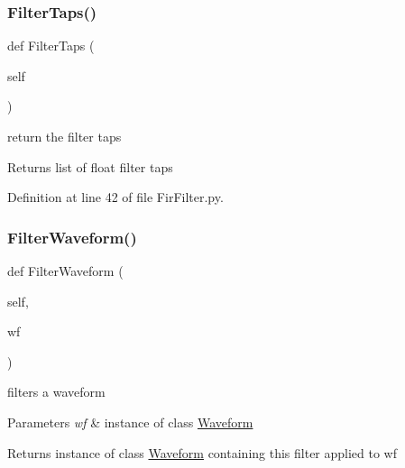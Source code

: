 \subsubsection{\texorpdfstring{Filter\+Taps()}{FilterTaps()}}
{\footnotesize\ttfamily def Filter\+Taps (\begin{DoxyParamCaption}\item[{}]{self }\end{DoxyParamCaption})}



return the filter taps 

\begin{DoxyReturn}{Returns}
list of float filter taps 
\end{DoxyReturn}


Definition at line 42 of file Fir\+Filter.\+py.

\mbox{\label{classSignalIntegrity_1_1TimeDomain_1_1Filters_1_1FirFilter_1_1FirFilter_a84e73c18250ca4a61482f94ad61e735b}} 
\subsubsection{\texorpdfstring{Filter\+Waveform()}{FilterWaveform()}}
{\footnotesize\ttfamily def Filter\+Waveform (\begin{DoxyParamCaption}\item[{}]{self,  }\item[{}]{wf }\end{DoxyParamCaption})}



filters a waveform 


\begin{DoxyParams}{Parameters}
{\em wf} & instance of class \hyperlink{namespaceSignalIntegrity_1_1TimeDomain_1_1Waveform}{Waveform} \\
\hline
\end{DoxyParams}
\begin{DoxyReturn}{Returns}
instance of class \hyperlink{namespaceSignalIntegrity_1_1TimeDomain_1_1Waveform}{Waveform} containing this filter applied to wf 
\end{DoxyReturn}


